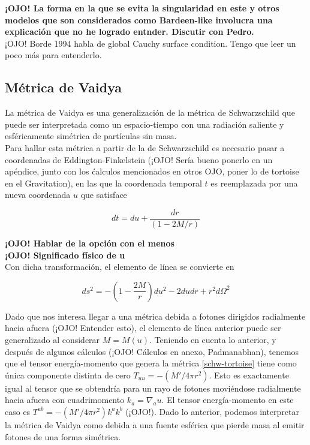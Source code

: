 \documentclass[prb,aps,preprintnumbers,amsmath,amssymb]{article}
\numberwithin{equation}{section}
\begin{document}
\textbf{¡OJO! La forma en la que se evita la singularidad en este y otros modelos que son considerados como Bardeen-like involucra una explicación que no he logrado entnder. Discutir con Pedro.}\\

¡OJO! Borde 1994 habla de global Cauchy surface condition. Tengo que leer un poco más para entenderlo.


\subsection{Métrica de Vaidya}

La métrica de Vaidya \cite{padmanabhan} es una generalización de la métrica de Schwarzschild que puede ser interpretada como un espacio-tiempo con una radiación saliente y esféricamente simétrica de partículas sin masa.\\

Para hallar esta métrica a partir de la de Schwarzschild es necesario pasar a coordenadas de Eddington-Finkelstein (¡OJO! Sería bueno ponerlo en un apéndice, junto con los ćalculos mencionados en otros OJO, poner lo de tortoise en el Gravitation), en las que la coordenada temporal $t$ es reemplazada por una nueva coordenada $u$ que satisface

\begin{equation}
dt = du + \frac{dr}{(1 - 2M/r)}
\end{equation}

\textbf{¡OJO! Hablar de la opción con el menos}\\

\textbf{¡OJO! Significado físico de u}\\

Con dicha transformación, el elemento de línea se convierte en 

\begin{equation}
\label{schw-tortoise}
ds^2 = - \left(1- \frac{2M}{r}\right)du^2 - 2dudr + r^2d\Omega^2
\end{equation}

Dado que nos interesa llegar a una métrica debida a fotones dirigidos radialmente hacia afuera (¡OJO! Entender esto), el elemento de línea anterior puede ser generalizado al considerar $M = M(u)$. Teniendo en cuenta lo anterior, y después de algunos cálculos (¡OJO! Cálculos en anexo, Padmanabhan), tenemos que el tensor energía-momento que genera la métrica \eqref{schw-tortoise} tiene como única componente distinta de cero $T_{uu} = -(M'/4 \pi r^2)$. Esto es exactamente igual al tensor que se obtendría para un rayo de fotones moviéndose radialmente hacia afuera con cuadrimomento $k_{a} = \nabla_{a}u$. El tensor energía-momento en este caso es $T^{ab} = -(M'/4 \pi r^2)k^{a}k^{b}$ (¡OJO!). Dado lo anterior, podemos interpretar la métrica de Vaidya como debida a una fuente esférica que pierde masa al emitir fotones de una forma simétrica.\\
\end{document}
